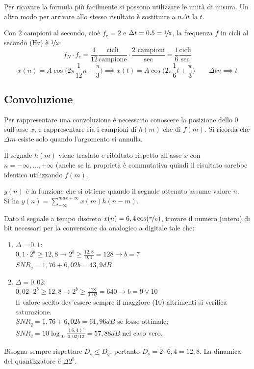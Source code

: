 Per ricavare la formula più facilmente si possono utilizzare le unità di misura. Un altro modo per arrivare allo stesso risultato è sostituire a $n\Delta t$ la $t$.

Con 2 campioni al secondo, cioè $f_c = 2$ e $\Delta t = 0.5 = \nicefrac{1}{2}$, la frequenza $f$ in cicli al secondo (Hz) è $\nicefrac{1}{2}$:
$$f_N \cdot f_c = \frac{1}{12} \frac{\text{cicli}}{\text{campione}} \cdot \frac{2 \text{ campioni}}{\text{sec}} = \frac{1}{6} \frac{\text{cicli}}{\text{sec}}$$
$$x(n) = A\cos \Big(2\pi \frac{1}{12}n + \frac{\pi}{3}\Big) \implies x(t) = A\cos\Big(2\pi \frac{1}{6}t + \frac{\pi}{3}\Big) \qquad \Delta tn \implies t$$

\subsection{Convoluzione}
Per rappresentare una convoluzione è necessario conoscere la posizione dello 0 sull'asse $x$, e rappresentare sia i campioni di $h(m)$ che di $f(m)$. Si ricorda che $\Delta m$ esiste solo quando l'argomento si annulla.

Il segnale $h(m)$ viene traslato e ribaltato rispetto all'asse $x$ con $n = -\infty, \dots, +\infty$ (anche se la proprietà è commutativa quindi il risultato sarebbe identico utilizzando $f(m)$. 

$y(n)$ è la funzione che si ottiene quando il segnale ottenuto assume valore $n$. \\
Si ha $y(n) = \sum_{-\infty}^{max+\infty} x(m)h(n - m)$.


Dato il segnale a tempo discreto $x(n) = 6,4 \cos (\nicefrac{\pi}{n})$, trovare il numero (intero) di bit necessari per la conversione da analogico a digitale tale che:
\begin{enumerate}
	\item $\Delta = 0,1$: \\
	$0,1 \cdot 2^b \geq 12,8 \rightarrow 2^b \geq \frac{12,8}{0,1} = 128 \rightarrow b = 7$ \\
	$SNR_q = 1,76 + 6,02b = 43,9 dB$
	\item $\Delta = 0,02$: \\
	$0,02 \cdot 2^b \geq 12,8 \rightarrow 2^b \geq \frac{128}{0,02} = 640 \rightarrow b = 9 \lor 10$ \\
	Il valore scelto dev'essere sempre il maggiore (10) altrimenti si verifica saturazione. \\
	$SNR_q = 1,76 + 6,02b = 61,96 dB$ se fosse ottimale;
	$SNR_q = 10\log_{10} \frac{(6,4)^2}{0,02 / 12} = 57,88 dB$ nel caso vero.
	\end{enumerate}
Bisogna sempre rispettare $D_s \leq D_q$, pertanto $D_s = 2 \cdot 6,4 = 12,8$. La dinamica del quantizzatore è $\Delta 2^b$. 

